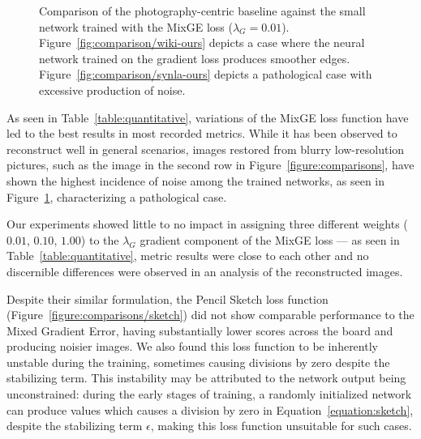 \begin{figure}[htbp]
    \centering

    \smallbreak

    \caption{
        \label{fig:comparison}
        Comparison of the photography-centric baseline against the small network trained with the MixGE loss ($\lambda_G = 0.01$).
        Figure~\ref{fig:comparison/wiki-ours} depicts a case where the neural network trained on the gradient loss produces smoother edges.
        Figure~\ref{fig:comparison/synla-ours} depicts a pathological case with excessive production of noise.
    }
\end{figure}

As seen in Table~\ref{table:quantitative}, variations of the MixGE loss function have led to the best results in most recorded metrics. While it has been observed to reconstruct well in general scenarios, images restored from blurry low-resolution pictures, such as the image in the second row in Figure~\ref{figure:comparisons}, have shown the highest incidence of noise among the trained networks, as seen in Figure~\ref{fig:comparison}, characterizing a pathological case.

Our experiments showed little to no impact in assigning three different weights ($0.01$, $0.10$, $1.00$) to the $\lambda_G$ gradient component of the MixGE loss --- as seen in Table~\ref{table:quantitative}, metric results were close to each other and no discernible differences were observed in an analysis of the reconstructed images.

Despite their similar formulation, the Pencil Sketch loss function (Figure~\ref{figure:comparisons/sketch}) did not show comparable performance to the Mixed Gradient Error, having substantially lower scores across the board and producing noisier images.
We also found this loss function to be inherently unstable during the training, sometimes causing divisions by zero despite the stabilizing term. This instability may be attributed to the network output being unconstrained: during the early stages of training, a randomly initialized network can produce values which causes a division by zero in Equation~\ref{equation:sketch}, despite the stabilizing term $\epsilon$, making this loss function unsuitable for such cases.

